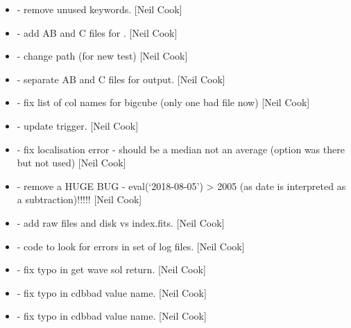 \documentclass[a4paper,10pt,english]{report}
\begin{document}
\begin{itemize}
\item {} 
 - remove unused keywords. {[}Neil Cook{]}

\item {} 
 - add AB and C files for . {[}Neil Cook{]}

\item {} 
 - change path (for new test) {[}Neil Cook{]}

\item {} 
 - separate AB and C files for output. {[}Neil
Cook{]}

\item {} 
 - fix list of col names for bigcube (only one bad
file now) {[}Neil Cook{]}

\item {} 
 - update trigger. {[}Neil Cook{]}

\item {} 
 - fix localisation error - should be a median not an
average (option was there but not used) {[}Neil Cook{]}

\item {} 
 - remove a HUGE BUG - eval(‘2018-08-05’) \textendash{}\textgreater{} 2005 (as
date is interpreted as a subtraction)!!!!! {[}Neil Cook{]}

\item {} 
 - add raw files and disk vs index.fits.
{[}Neil Cook{]}

\item {} 
 - code to look for errors in set of log files. {[}Neil
Cook{]}

\item {} 
 - fix typo in get wave sol return. {[}Neil
Cook{]}

\item {} 
 - fix typo in cdbbad value name. {[}Neil Cook{]}

\item {} 
 - fix typo in cdbbad value name. {[}Neil Cook{]}

\end{itemize}
\end{document}
